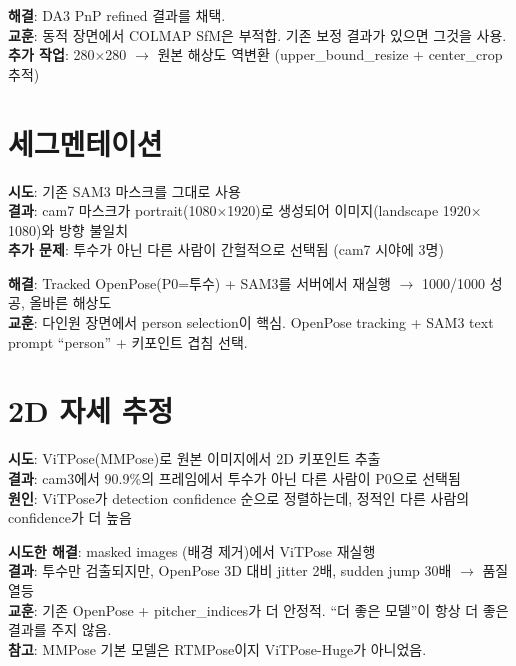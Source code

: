 \documentclass[11pt, a4paper]{report}
\begin{document}
\begin{fixbox}
\textbf{해결}: DA3 PnP refined 결과를 채택.\\
\textbf{교훈}: 동적 장면에서 COLMAP SfM은 부적합. 기존 보정 결과가 있으면 그것을 사용.\\
\textbf{추가 작업}: 280$\times$280 $\rightarrow$ 원본 해상도 역변환 (upper\_bound\_resize + center\_crop 추적)
\end{fixbox}


\section{세그멘테이션}

\begin{failbox}[title={실패 2: cam7 SAM3 마스크 방향 불일치}]
\textbf{시도}: 기존 SAM3 마스크를 그대로 사용\\
\textbf{결과}: cam7 마스크가 portrait(1080$\times$1920)로 생성되어 이미지(landscape 1920$\times$1080)와 방향 불일치\\
\textbf{추가 문제}: 투수가 아닌 다른 사람이 간헐적으로 선택됨 (cam7 시야에 3명)
\end{failbox}

\begin{fixbox}
\textbf{해결}: Tracked OpenPose(P0=투수) + SAM3를 서버에서 재실행 $\rightarrow$ 1000/1000 성공, 올바른 해상도\\
\textbf{교훈}: 다인원 장면에서 person selection이 핵심. OpenPose tracking + SAM3 text prompt ``person'' + 키포인트 겹침 선택.
\end{fixbox}


\section{2D 자세 추정}

\begin{failbox}[title={실패 3: ViTPose person 선택 실패}]
\textbf{시도}: ViTPose(MMPose)로 원본 이미지에서 2D 키포인트 추출\\
\textbf{결과}: cam3에서 90.9\%의 프레임에서 투수가 아닌 다른 사람이 P0으로 선택됨\\
\textbf{원인}: ViTPose가 detection confidence 순으로 정렬하는데, 정적인 다른 사람의 confidence가 더 높음
\end{failbox}

\begin{fixbox}
\textbf{시도한 해결}: masked images (배경 제거)에서 ViTPose 재실행\\
\textbf{결과}: 투수만 검출되지만, OpenPose 3D 대비 jitter 2배, sudden jump 30배 $\rightarrow$ 품질 열등\\
\textbf{교훈}: 기존 OpenPose + pitcher\_indices가 더 안정적. ``더 좋은 모델''이 항상 더 좋은 결과를 주지 않음.\\
\textbf{참고}: MMPose 기본 모델은 RTMPose이지 ViTPose-Huge가 아니었음.
\end{fixbox}
\end{document}
